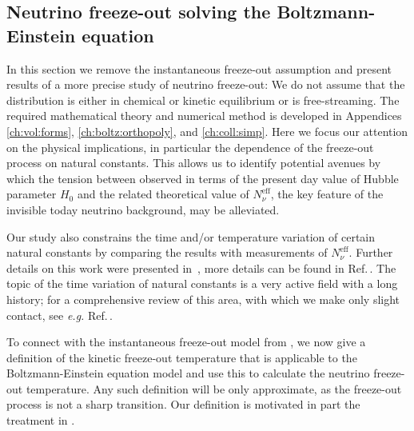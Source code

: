 \subsection{Neutrino freeze-out solving the Boltzmann-Einstein equation}\label{ch:param:studies}
In this section we remove the instantaneous freeze-out assumption and present results of a more precise study of neutrino freeze-out: We do not assume that the distribution is either in chemical or kinetic equilibrium or is free-streaming. The required mathematical theory and numerical method is developed in Appendices \ref{ch:vol:forms}, \ref{ch:boltz:orthopoly}, and \ref{ch:coll:simp}. Here we focus our attention on the physical implications, in particular the dependence of the freeze-out process on natural constants. This allows us to identify potential avenues by which the tension between observed in terms of the present day value of Hubble parameter $H_0$ and the related theoretical value of $N^{\mathrm{eff}}_\nu$, the key feature of the invisible today neutrino background, may be alleviated. 

Our study also constrains the time and/or temperature variation of certain natural constants by comparing the results with measurements of $N_\nu^{\mathrm{eff}}$. Further details on this work were presented in~, more details can be found in Ref.\,\cite{Birrell:2014uka}. The topic of the time variation of natural constants is a very active field with a long history; for a comprehensive review of this area, with which we make only slight contact, see {\it e.g.\/} Ref.\,\cite{Uzan:2010pm}. 

To connect with the instantaneous freeze-out model from , we now give a definition of the kinetic freeze-out temperature that is applicable to the Boltzmann-Einstein equation model and use this to calculate the neutrino freeze-out temperature. Any such definition will be only approximate, as the freeze-out process is not a sharp transition. Our definition is motivated in part the treatment in \cite{Kolb:1990vq}. 

